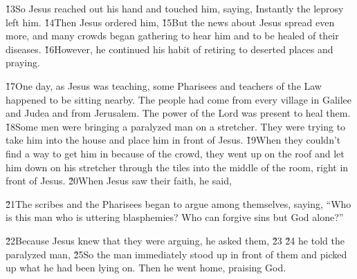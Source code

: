 \v{13}So Jesus reached out his hand and touched him, saying,  Instantly the leprosy left him. \v{14}Then Jesus ordered him,  \v{15}But the news about Jesus spread even more, and many crowds began gathering to hear him and to be healed of their diseases. \v{16}However, he continued his habit of retiring to deserted places and praying.

\v{17}One day, as Jesus was teaching, some Pharisees and teachers of the Law happened to be sitting nearby. The people had come from every village in Galilee and Judea and from Jerusalem. The power of the Lord was present to heal them. \v{18}Some men were bringing a paralyzed man on a stretcher. They were trying to take him into the house and place him in front of Jesus. \v{19}When they couldn't find a way to get him in because of the crowd, they went up on the roof and let him down on his stretcher through the tiles into the middle of the room, right in front of Jesus. \v{20}When Jesus saw their faith, he said,  

\v{21}The scribes and the Pharisees began to argue among themselves, saying, ``Who is this man who is uttering blasphemies? Who can forgive sins but God alone?''

\v{22}Because Jesus knew that they were arguing, he asked them,  \v{23} \red{,}\red{,} \v{24} \red{{\ldots}} he told the paralyzed man,  \v{25}So the man immediately stood up in front of them and picked up what he had been lying on. Then he went home, praising God.

